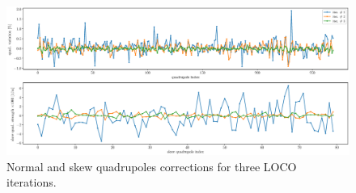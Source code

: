 \begin{figure}
\centering
\includegraphics[width=1.0\textwidth]{figures/loco_quad_skewquad_corrections.eps}
\caption{Normal and skew quadrupoles corrections for three LOCO iterations.}
\label{fig:loco_corrections}
\end{figure}

